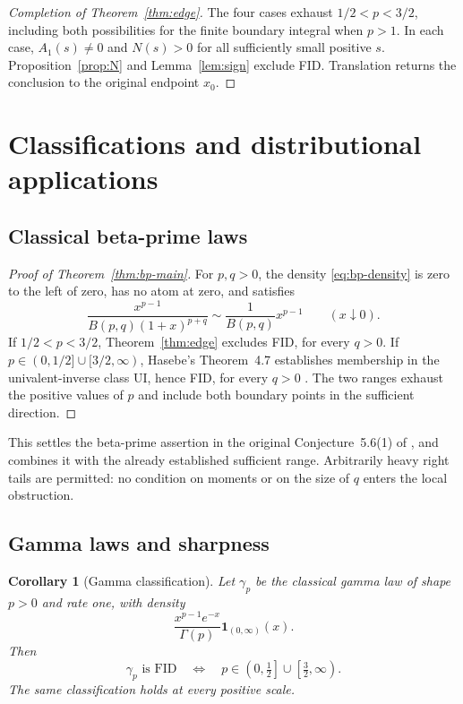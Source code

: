 \documentclass[11pt,a4paper]{article}
\newtheorem{corollary}[theorem]{Corollary}
\theoremstyle{definition}
\theoremstyle{remark}
\newcommand{\Good}{\left(0,\tfrac12\right]\cup\left[\tfrac32,\infty\right)}
\begin{document}
\begin{proof}[Completion of Theorem~\ref{thm:edge}]
The four cases exhaust $1/2<p<3/2$, including both possibilities
for the finite boundary integral when $p>1$. In each case,
$A_1(s)\ne0$ and $N(s)>0$ for all sufficiently small positive $s$.
Proposition~\ref{prop:N} and Lemma~\ref{lem:sign} exclude FID.
Translation returns the conclusion to the original endpoint $x_0$.
\end{proof}

\section{Classifications and distributional applications}
\label{sec:applications}

\subsection{Classical beta-prime laws}

\begin{proof}[Proof of Theorem~\ref{thm:bp-main}]
For $p,q>0$, the density \eqref{eq:bp-density} is zero to the left
of zero, has no atom at zero, and satisfies
\[
 \frac{x^{p-1}}{B(p,q)(1+x)^{p+q}}
 \sim\frac1{B(p,q)}x^{p-1}\qquad(x\downarrow0).
\]
If $1/2<p<3/2$, Theorem~\ref{thm:edge} excludes FID, for every
$q>0$. If $p\in(0,1/2]\cup[3/2,\infty)$, Hasebe's
Theorem~4.7 establishes membership in the univalent-inverse class
$\mathrm{UI}$, hence FID, for every $q>0$
\cite[Theorem~1.2(3)]{Hasebe2014}. The two ranges exhaust the
positive values of $p$ and include both boundary points in the
sufficient direction.
\end{proof}

This settles the beta-prime assertion in the original
Conjecture~5.6(1) of \cite{Hasebe2013}, and combines it with the
already established sufficient range. Arbitrarily heavy right tails
are permitted: no condition on moments or on the size of $q$ enters
the local obstruction.

\subsection{Gamma laws and sharpness}

\begin{corollary}[Gamma classification]\label{cor:gamma}
Let $\gamma_p$ be the classical gamma law of shape $p>0$ and rate
one, with density
\[
 \frac{x^{p-1}e^{-x}}{\Gamma(p)}\mathbf1_{(0,\infty)}(x).
\]
Then
\[
 \gamma_p\text{ is FID}
 \quad\Longleftrightarrow\quad p\in\Good.
\]
The same classification holds at every positive scale.
\end{corollary}
\end{document}
